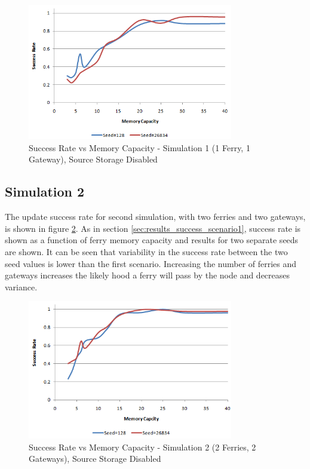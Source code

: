 \begin{figure}[htbp]
    \begin{center}
    \includegraphics[width=0.8\textwidth]{images/result_sccess_sim1byseed_dss.png}
    \caption{Success Rate vs Memory Capacity - Simulation 1 (1 Ferry, 1 Gateway), Source Storage Disabled}
    \label{fig:result_sccess_sim1byseed_dss}
    \end{center}
\end{figure}

\subsection{Simulation 2}
\label{sec:results_success_s2}

The update success rate for second simulation, with two ferries and two gateways, is shown in figure \ref{fig:result_sccess_sim2byseed_dss}.
As in section \ref{sec:results_success_scenario1}, success rate is shown as a function of ferry memory capacity and results for two separate seeds are shown.
It can be seen that variability in the success rate between the two seed values is lower than the first scenario.
Increasing the number of ferries and gateways increases the likely hood a ferry will pass by the node and decreases variance.

\begin{figure}[htbp]
    \centering
    \includegraphics[width=0.8\textwidth]{images/result_sccess_sim2byseed_dss.png}
    \caption{Success Rate vs Memory Capacity - Simulation 2 (2 Ferries, 2 Gateways), Source Storage Disabled}
    \label{fig:result_sccess_sim2byseed_dss}
\end{figure}

